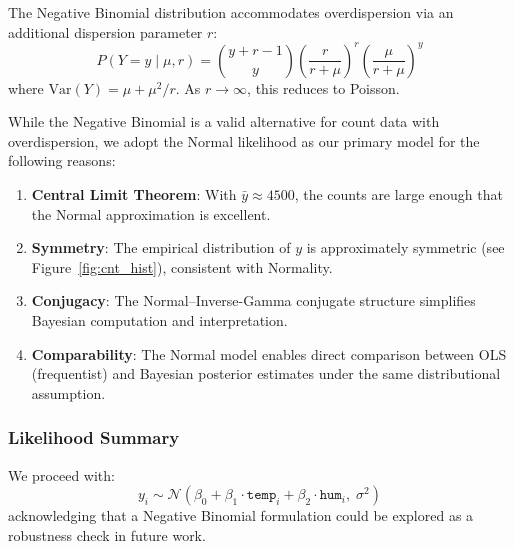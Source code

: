 The Negative Binomial distribution accommodates overdispersion via an additional dispersion parameter $r$:
\begin{equation}
    P(Y = y \mid \mu, r) = \binom{y + r - 1}{y} \left(\frac{r}{r + \mu}\right)^r \left(\frac{\mu}{r + \mu}\right)^y
\end{equation}
where $\text{Var}(Y) = \mu + \mu^2 / r$. As $r \to \infty$, this reduces to Poisson.

While the Negative Binomial is a valid alternative for count data with overdispersion, we adopt the Normal likelihood as our primary model for the following reasons:
\begin{enumerate}
    \item \textbf{Central Limit Theorem}: With $\bar{y} \approx 4500$, the counts are large enough that the Normal approximation is excellent.
    \item \textbf{Symmetry}: The empirical distribution of $y$ is approximately symmetric (see Figure~\ref{fig:cnt_hist}), consistent with Normality.
    \item \textbf{Conjugacy}: The Normal--Inverse-Gamma conjugate structure simplifies Bayesian computation and interpretation.
    \item \textbf{Comparability}: The Normal model enables direct comparison between OLS (frequentist) and Bayesian posterior estimates under the same distributional assumption.
\end{enumerate}

\subsubsection{Likelihood Summary}

We proceed with:
\begin{equation}
    y_i \sim \mathcal{N}(\beta_0 + \beta_1 \cdot \texttt{temp}_i + \beta_2 \cdot \texttt{hum}_i, \; \sigma^2)
\end{equation}
acknowledging that a Negative Binomial formulation could be explored as a robustness check in future work.
